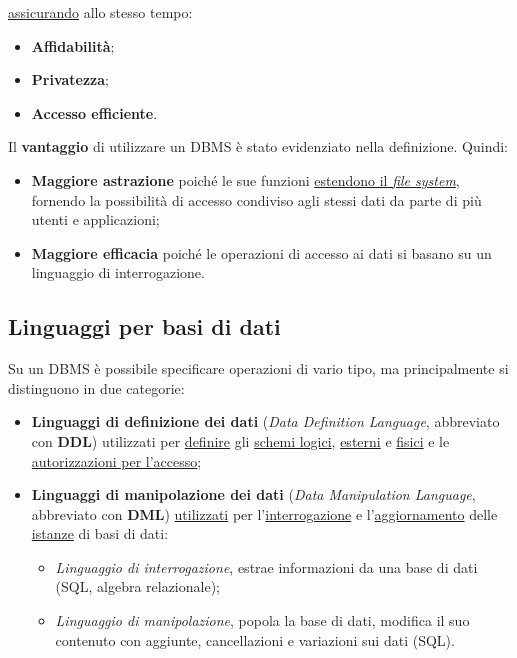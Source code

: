 \documentclass[a4paper]{article}
\begin{document}
	\noindent
	\underline{assicurando} allo stesso tempo:
	
	\begin{itemize}
		\item[\ding{72}] \textbf{Affidabilità};
		\item[\ding{72}] \textbf{Privatezza};
		\item[\ding{72}] \textbf{Accesso efficiente}.
	\end{itemize}

	Il \textbf{vantaggio} di utilizzare un DBMS è stato evidenziato nella definizione. Quindi:
	
	\begin{itemize}
		\item[\ding{51}] \textbf{Maggiore astrazione} poiché le sue funzioni \underline{estendono il \emph{file system}}, fornendo la possibilità di accesso condiviso agli stessi dati da parte di più utenti e applicazioni;
		\item[\ding{51}] \textbf{Maggiore efficacia} poiché le operazioni di accesso ai dati si basano su un linguaggio di interrogazione.
	\end{itemize}
	
	
	
	
	\subsection{Linguaggi per basi di dati}
	Su un DBMS è possibile specificare operazioni di vario tipo, ma principalmente si distinguono in due categorie:

	\begin{itemize}
		\item \textbf{Linguaggi di definizione dei dati} (\emph{Data Definition Language}, abbreviato con \textbf{DDL}) utilizzati per \underline{definire} gli \underline{schemi logici}, \underline{esterni} e \underline{fisici} e le \underline{autorizzazioni per l'accesso};
		\item \textbf{Linguaggi di manipolazione dei dati} (\emph{Data Manipulation Language}, abbreviato con \textbf{DML}) \underline{utilizzati} per l'\underline{interrogazione} e l'\underline{aggiornamento} delle \underline{istanze} di basi di dati:
		\begin{itemize}
			\item \emph{Linguaggio di interrogazione}, estrae informazioni da una base di dati (SQL, algebra relazionale);
			\item \emph{Linguaggio di manipolazione}, popola la base di dati, modifica il suo contenuto con aggiunte, cancellazioni e variazioni sui dati (SQL).
		\end{itemize}
	\end{itemize}
	
\end{document}
